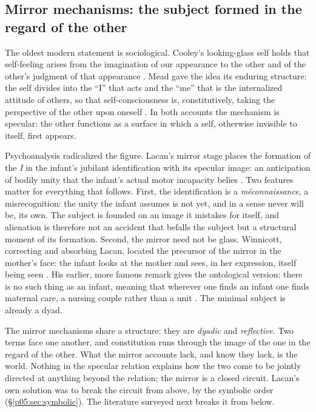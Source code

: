\subsection{Mirror mechanisms: the subject formed in the regard of the other}
\label{p05:sec:mirror}

The oldest modern statement is sociological. Cooley's looking-glass self holds that self-feeling arises from the imagination of our appearance to the other and of the other's judgment of that appearance \parencite{cooley1902}. Mead gave the idea its enduring structure: the self divides into the ``I'' that acts and the ``me'' that is the internalized attitude of others, so that self-consciousness is, constitutively, taking the perspective of the other upon oneself \parencite{mead1934}. In both accounts the mechanism is specular: the other functions as a surface in which a self, otherwise invisible to itself, first appears.

Psychoanalysis radicalized the figure. Lacan's mirror stage places the formation of the \emph{I} in the infant's jubilant identification with its specular image: an anticipation of bodily unity that the infant's actual motor incapacity belies \parencite{lacan2006}. Two features matter for everything that follows. First, the identification is a \emph{m\'econnaissance}, a misrecognition: the unity the infant assumes is not yet, and in a sense never will be, its own. The subject is founded on an image it mistakes for itself, and alienation is therefore not an accident that befalls the subject but a structural moment of its formation. Second, the mirror need not be glass. Winnicott, correcting and absorbing Lacan, located the precursor of the mirror in the mother's face: the infant looks at the mother and sees, in her expression, itself being seen \parencite{winnicott1971}. His earlier, more famous remark gives the ontological version: there is no such thing as an infant, meaning that wherever one finds an infant one finds maternal care, a nursing couple rather than a unit \parencite{winnicott1960}. The minimal subject is already a dyad.

The mirror mechanisms share a structure: they are \emph{dyadic} and \emph{reflective}. Two terms face one another, and constitution runs through the image of the one in the regard of the other. What the mirror accounts lack, and know they lack, is the world. Nothing in the specular relation explains how the two come to be jointly directed at anything beyond the relation; the mirror is a closed circuit. Lacan's own solution was to break the circuit from above, by the symbolic order (§\ref{p05:sec:symbolic}). The literature surveyed next breaks it from below.

